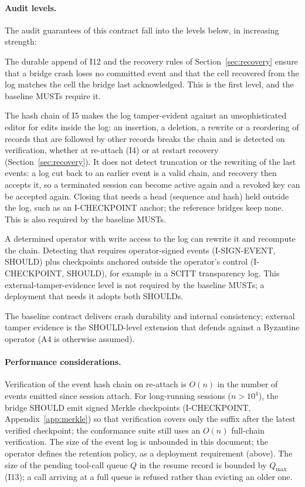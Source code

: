 \paragraph{Audit levels.} The audit guarantees of this contract
fall into the levels below, in increasing strength:
\begin{description}[leftmargin=2em]
\item[Crash durability (I12).] The durable append of I12 and the
recovery rules of Section~\ref{sec:recovery} ensure that a bridge
crash loses no committed event and that the cell recovered from the
log matches the cell the bridge last acknowledged. This is the first
level, and the baseline MUSTs require it.
\item[Internal consistency (I5).] The hash chain of I5 makes the log
tamper-evident against an unsophisticated editor for edits inside the
log: an insertion, a deletion, a rewrite or a reordering of records
that are followed by other records breaks the chain and is detected on
verification, whether at re-attach (I4) or at restart recovery
(Section~\ref{sec:recovery}). It does not detect truncation or the
rewriting of the last events: a log cut back to an earlier event is a
valid chain, and recovery then accepts it, so a terminated session can
become active again and a revoked key can be accepted again. Closing
that needs a head (sequence and hash) held outside the log, such as an
I-CHECKPOINT anchor; the reference bridges keep none. This is also
required by the baseline MUSTs.
\item[External tamper evidence (I-SIGN-EVENT, I-CHECKPOINT).] A
determined operator with write access to the log can rewrite it and
recompute the chain. Detecting that requires operator-signed events
(I-SIGN-EVENT, SHOULD) plus checkpoints anchored outside the
operator's control (I-CHECKPOINT, SHOULD), for example in a SCITT
transparency log. This external-tamper-evidence level is not required by the baseline
MUSTs; a deployment that needs it adopts both SHOULDs.
\end{description}
The baseline contract delivers crash durability and internal
consistency; external tamper evidence is the SHOULD-level extension
that defends against a Byzantine operator (A4 is otherwise assumed).

\paragraph{Performance considerations.} Verification of the event hash
chain on re-attach is $O(n)$ in the number of events emitted since
session attach. For long-running sessions ($n > 10^4$), the bridge
SHOULD emit signed Merkle checkpoints (I-CHECKPOINT,
Appendix~\ref{app:merkle}) so that verification covers only the suffix
after the latest verified checkpoint; the conformance suite still uses
an $O(n)$ full-chain verification. The size of the event log is unbounded in this document;
the operator defines the retention policy, as a deployment requirement (above). The size of the pending
tool-call queue $Q$ in the resume record is bounded by $Q_{\max}$ (I13);
a call arriving at a full queue is refused rather than evicting an
older one.

